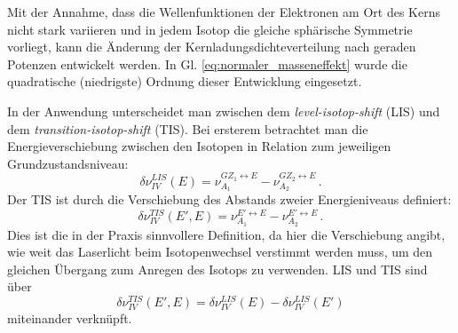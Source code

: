 Mit der Annahme, dass die Wellenfunktionen der Elektronen am Ort des Kerns
nicht stark variieren und in jedem Isotop die gleiche sphärische Symmetrie
vorliegt, kann die Änderung der Kernladungsdichteverteilung nach geraden
Potenzen entwickelt werden. In Gl. \eqref{eq:normaler_masseneffekt} wurde
die quadratische (niedrigste) Ordnung dieser Entwicklung eingesetzt.\par
In der Anwendung unterscheidet man zwischen dem \textit{level-isotop-shift}
(LIS) und dem \textit{transition-isotop-shift} (TIS). Bei ersterem betrachtet
man die Energieverschiebung zwischen den Isotopen in Relation zum jeweiligen
Grundzustandsniveau:
\begin{equation}\label{eq:LIS}
	\delta\nu_{IV}^{LIS}(E)=\nu_{A_1}^{GZ_1\leftrightarrow
	E}-\nu_{A_2}^{GZ_2\leftrightarrow E}\,.
\end{equation}
Der TIS ist durch die Verschiebung des Abstands zweier Energieniveaus definiert:
\begin{equation}\label{eq:TIS}
	\delta\nu_{IV}^{TIS}(E',E)=\nu_{A_1}^{E'\leftrightarrow
	E}-\nu_{A_2}^{E'\leftrightarrow E}\,.
\end{equation}
Dies ist die in der Praxis sinnvollere Definition, da hier die Verschiebung
angibt, wie weit das Laserlicht beim Isotopenwechsel verstimmt werden muss, um
den gleichen Übergang zum Anregen des Isotops zu verwenden. LIS und TIS sind
über
\begin{equation}\label{eq:TIS_LIS_verknuepfung}
	\delta\nu_{IV}^{TIS}(E',E)=\delta\nu_{IV}^{LIS}(E)-\delta\nu_{IV}^{LIS}(E')
\end{equation}
miteinander verknüpft.

